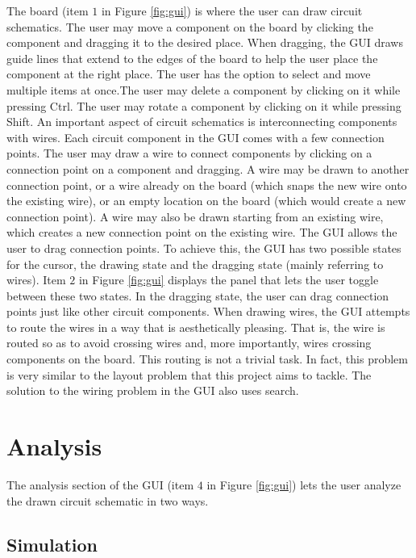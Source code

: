 The board (item $1$ in Figure \ref{fig:gui}) is where the user can draw circuit
schematics. The user may move a component on the board by clicking the component
and dragging it to the desired place. When dragging, the GUI draws guide lines
that extend to the edges of the board to help the user place the component
at the right place. The user has the option to select and move multiple items at
once.The user may delete a component by clicking on it while
pressing Ctrl. The user may rotate a component by clicking on it
while pressing Shift. An important aspect of circuit schematics is
interconnecting components with wires. Each circuit component in the GUI comes
with a few connection points. The user may draw a wire to connect
components by clicking on a connection point on a component and dragging.
A wire may be drawn to another connection
point, or a wire already on the board (which snaps the new wire onto the
existing wire), or an empty location on the board (which would create a new
connection point). A wire may also be drawn starting from an existing wire,
which creates a new connection point on the existing wire. The GUI allows the
user to drag connection points. To achieve this, the GUI has two possible
states for the cursor, the drawing state and the dragging state (mainly
referring to wires). Item $2$ in Figure \ref{fig:gui} displays the panel that
lets the user toggle between these two states. In the dragging state, the user
can drag connection points just like other circuit components.
When drawing wires,
the GUI attempts to route the wires in a way that is aesthetically pleasing.
That is, the wire is routed so as to avoid crossing wires and, more importantly,
wires crossing components on the board. This routing is not a trivial
task. In fact, this problem is very similar to the layout problem that this
project aims to tackle. The solution to the wiring problem in the GUI also uses
search.

\section{Analysis}

The analysis section of the GUI (item $4$ in Figure \ref{fig:gui}) lets the user
analyze the drawn circuit schematic in two ways.

\subsection{Simulation}

